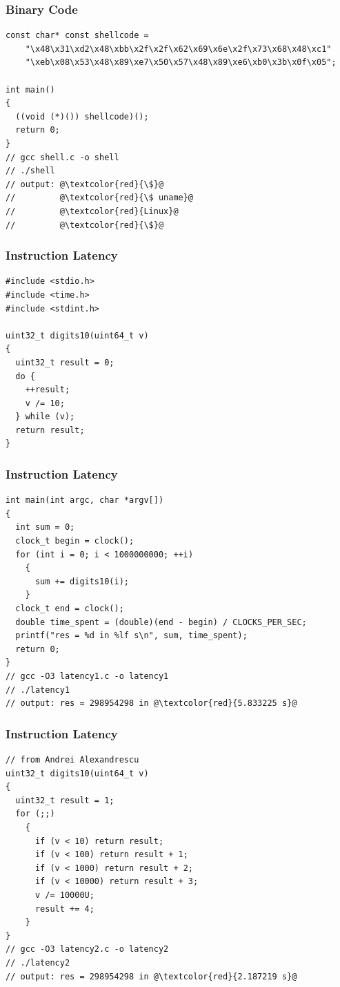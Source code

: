 \documentclass{beamer}
\begin{document}
\begin{frame}[fragile]
\frametitle{Binary Code}
\scriptsize
\begin{lstlisting}
const char* const shellcode =
    "\x48\x31\xd2\x48\xbb\x2f\x2f\x62\x69\x6e\x2f\x73\x68\x48\xc1"
    "\xeb\x08\x53\x48\x89\xe7\x50\x57\x48\x89\xe6\xb0\x3b\x0f\x05";

int main()
{
  ((void (*)()) shellcode)();
  return 0;
}
// gcc shell.c -o shell
// ./shell
// output: @\textcolor{red}{\$}@
//         @\textcolor{red}{\$ uname}@
//         @\textcolor{red}{Linux}@
//         @\textcolor{red}{\$}@
\end{lstlisting}

\end{frame}

\begin{frame}[fragile]
\frametitle{Instruction Latency}
\scriptsize
\begin{lstlisting}
#include <stdio.h>
#include <time.h>
#include <stdint.h>

uint32_t digits10(uint64_t v)
{
  uint32_t result = 0;
  do {
    ++result;
    v /= 10;
  } while (v);
  return result;
}
\end{lstlisting}

\end{frame}

\begin{frame}[fragile]
\frametitle{Instruction Latency}
\scriptsize
\begin{lstlisting}[linebackgroundcolor={\lstcolorlines{5,6,7,8}}]
int main(int argc, char *argv[])
{
  int sum = 0;
  clock_t begin = clock();
  for (int i = 0; i < 1000000000; ++i)
    {
      sum += digits10(i);
    }
  clock_t end = clock();
  double time_spent = (double)(end - begin) / CLOCKS_PER_SEC;
  printf("res = %d in %lf s\n", sum, time_spent);
  return 0;
}
// gcc -O3 latency1.c -o latency1
// ./latency1
// output: res = 298954298 in @\textcolor{red}{5.833225 s}@
\end{lstlisting}

\end{frame}

\begin{frame}[fragile]
\frametitle{Instruction Latency}
\scriptsize
\begin{lstlisting}
// from Andrei Alexandrescu
uint32_t digits10(uint64_t v)
{
  uint32_t result = 1;
  for (;;)
    {
      if (v < 10) return result;
      if (v < 100) return result + 1;
      if (v < 1000) return result + 2;
      if (v < 10000) return result + 3;
      v /= 10000U;
      result += 4;
    }
}
// gcc -O3 latency2.c -o latency2
// ./latency2
// output: res = 298954298 in @\textcolor{red}{2.187219 s}@
\end{lstlisting}

\end{frame}
\end{document}
